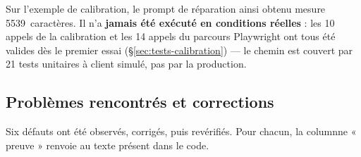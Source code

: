 Sur l'exemple de calibration, le prompt de réparation ainsi obtenu mesure
5539~caractères. Il n'a \textbf{jamais été exécuté en conditions réelles} : les
10 appels de la calibration et les 14 appels du parcours Playwright ont tous
été valides dès le premier essai (§\ref{sec:tests-calibration}) --- le chemin
est couvert par 21 tests unitaires à client simulé, pas par la production.

\subsection{Problèmes rencontrés et corrections}
\label{sec:prompts-problemes}

Six défauts ont été observés, corrigés, puis revérifiés. Pour chacun, la
columnne « preuve » renvoie au texte présent dans le code.

